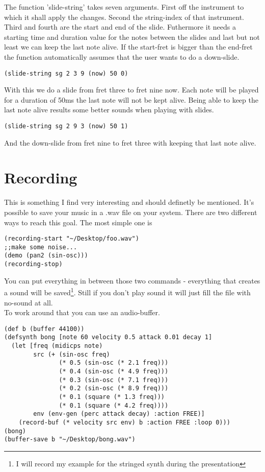 The function 'slide-string' takes seven arguments. First off the instrument to which it shall apply the changes. Second the string-index of that instrument. Third and fourth are the start and end of the slide. Futhermore it needs a starting time and duration value for the notes between the slides and last but not least we can keep the last note alive. If the start-fret is bigger than the end-fret the function automatically assumes that the user wants to do a down-slide.

\begin{lstlisting}
(slide-string sg 2 3 9 (now) 50 0)
\end{lstlisting}

With this we do a slide from fret three to fret nine now. Each note will be played for a duration of 50ms the last note will not be kept alive. Being able to keep the last note alive results some better sounds when playing with slides.

\begin{lstlisting}
(slide-string sg 2 9 3 (now) 50 1)
\end{lstlisting}
And the down-slide from fret nine to fret three with keeping that last note alive.

\chapter{Recording}
This is something I find very interesting and should definetly be mentioned. It's possible to save your music in a .wav file on your system.
There are two different ways to reach this goal. The most simple one is
\begin{lstlisting}
(recording-start "~/Desktop/foo.wav")
;;make some noise...
(demo (pan2 (sin-osc)))
(recording-stop)
\end{lstlisting}
You can put everything in between those two commands - everything that creates a sound will be saved\footnote{I will record my example for the stringed synth during the presentation}.
Still if you don't play sound it will just fill the file with no-sound at all.\\

To work around that you can use an audio-buffer.

\begin{lstlisting}
(def b (buffer 44100))
(defsynth bong [note 60 velocity 0.5 attack 0.01 decay 1] 
  (let [freq (midicps note) 
        src (+ (sin-osc freq) 
               (* 0.5 (sin-osc (* 2.1 freq))) 
               (* 0.4 (sin-osc (* 4.9 freq))) 
               (* 0.3 (sin-osc (* 7.1 freq))) 
               (* 0.2 (sin-osc (* 8.9 freq))) 
               (* 0.1 (square (* 1.3 freq))) 
               (* 0.1 (square (* 4.2 freq)))) 
        env (env-gen (perc attack decay) :action FREE)] 
    (record-buf (* velocity src env) b :action FREE :loop 0))) 
(bong)
(buffer-save b "~/Desktop/bong.wav") 
\end{lstlisting}


